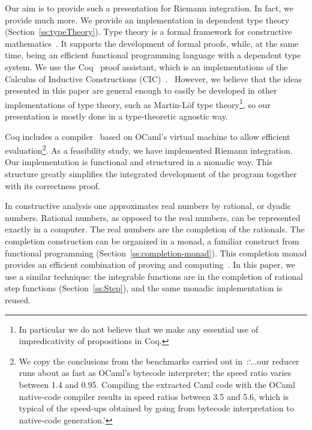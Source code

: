\documentclass{elsarticle}
\begin{document}
Our aim is to provide such a presentation for Riemann integration. In fact, we
provide much more. We provide an implementation in dependent type theory
(Section~\ref{ss:typeTheory}). Type theory is a formal framework for
constructive mathematics~{\cite{ITT,CMCP,NPS}}. It supports the development of
formal proofs, while, at the same time, being an efficient functional
programming language with a dependent type system. We use the
Coq~{\cite{Coq,BC04}} proof assistant, which is an implementations of the
Calculus of Inductive Constructions (CIC)~{\cite{CoquandHuet,CoquandPaulin}}.
\ However, we believe that the ideas presented in this paper are general
enough to easily be developed in other implementations of type theory, such as
Martin-L\"of type theory{\footnote{In particular we do not believe that we
make any essential use of impredicativity of propositions in
Coq.}}{\cite{ITT,CMCP,NPS}}, so our presentation is mostly done in a
type-theoretic agnostic way.

Coq includes a compiler~{\cite{Compiler}} based on OCaml's virtual machine to
allow efficient evaluation{\footnote{We copy the conclusions from the
benchmarks carried out in~{\cite{Compiler}}:`...our reducer runs about as fast
as OCaml's bytecode interpreter; the speed ratio varies between 1.4 and 0.95.
Compiling the extracted Caml code with the OCaml native-code compiler results
in speed ratios between 3.5 and 5.6, which is typical of the speed-ups
obtained by going from bytecode interpretation to native-code generation.'}}.
As a feasibility study, we have implemented Riemann integration. Our
implementation is functional and structured in a monadic way. This structure
greatly simplifies the integrated development of the program together with its
correctness proof.

In constructive analysis one approximates real numbers by rational, or dyadic
numbers. Rational numbers, as opposed to the real numbers, can be represented
exactly in a computer. The real numbers are the completion of the rationals.
The completion construction can be organized in a monad, a familiar construct
from functional programming (Section~\ref{ss:completion-monad}). This
completion monad provides an efficient combination of proving and
computing~{\cite{OConnor:mscs}}. In this paper, we use a similar technique:
the integrable functions are in the completion of rational step functions
(Section~\ref{ss:Step}), and the same monadic implementation is reused.
\end{document}
